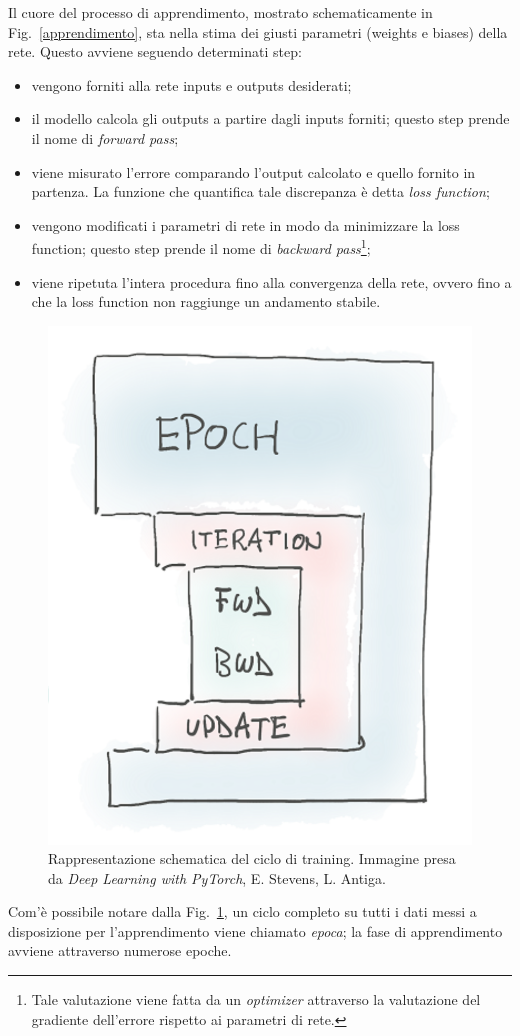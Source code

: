 \documentclass[12pt,a4paper,final]{book}
\begin{document}
Il cuore del processo di apprendimento, mostrato schematicamente in Fig.~\ref{apprendimento}, sta nella stima dei giusti parametri (weights e biases) della rete. Questo avviene seguendo determinati step:
\begin{itemize}
	\item vengono forniti alla rete inputs e outputs desiderati;
	\item il modello calcola gli outputs a partire dagli inputs forniti; questo step prende il nome di \textit{forward pass}; 
	\item viene misurato l'errore comparando l'output calcolato e quello fornito in partenza. La funzione che quantifica tale discrepanza è detta \textit{loss function};
	\item vengono modificati i parametri di rete in modo da minimizzare la loss function; questo step prende il nome di \textit{backward pass}\footnote{Tale valutazione viene fatta da un \textit{optimizer} attraverso la valutazione del gradiente dell'errore rispetto ai parametri di rete.};
	\item viene ripetuta l'intera procedura fino alla convergenza della rete, ovvero fino a che la loss function non raggiunge un andamento stabile.
\end{itemize}

\begin{figure}[!ht]
	\centering
	\includegraphics[width=0.4\linewidth]{../figures/ciclo_training.png}
	\caption{Rappresentazione schematica del ciclo di training. Immagine presa da \textit{Deep Learning with PyTorch}, E. Stevens, L. Antiga\cite{stevens}.}
	\label{ciclo_training}
\end{figure}

Com'è possibile notare dalla Fig.~\ref{ciclo_training}, un ciclo completo su tutti i dati messi a disposizione per l'apprendimento viene chiamato \textit{epoca}; la fase di apprendimento avviene attraverso numerose epoche.
\end{document}
